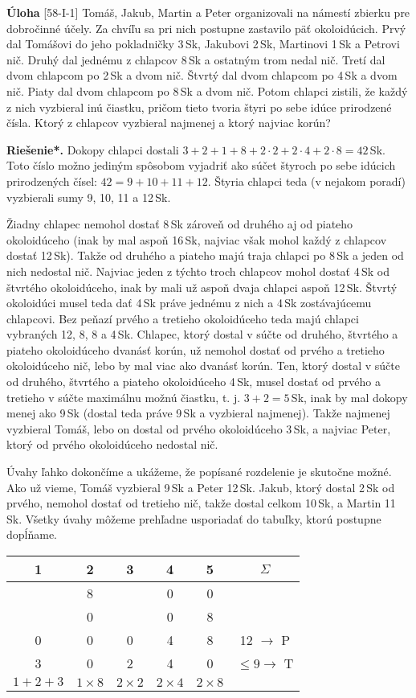 \documentclass{article}
\newcommand{\rieh}{\textbf{Riešenie*.} }
\newcommand{\problem}[4]{
  \begin{tcolorbox}[breakable,notitle,boxrule=0pt,colback=light-gray,colframe=light-gray]
    \textbf{Úloha}
    [#1] #3
  \end{tcolorbox}
  \noindent#4
}
\begin{document}
\problem{58-I-1}{}{
Tomáš, Jakub, Martin a Peter organizovali na námestí zbierku pre dobročinné účely. Za chvíľu sa pri nich postupne zastavilo päť okoloidúcich. Prvý dal Tomášovi do jeho pokladničky 3\,Sk, Jakubovi 2\,Sk, Martinovi 1\,Sk a Petrovi nič. Druhý dal jednému
z chlapcov 8\,Sk a ostatným trom nedal nič. Tretí dal dvom chlapcom po 2\,Sk a dvom nič. Štvrtý dal dvom chlapcom po 4\,Sk a dvom nič. Piaty dal dvom chlapcom po 8\,Sk a dvom nič. Potom chlapci zistili, že každý z nich vyzbieral inú čiastku, pričom tieto
tvoria štyri po sebe idúce prirodzené čísla. Ktorý z chlapcov vyzbieral najmenej a ktorý
najviac korún?
}{
\rieh Dokopy chlapci dostali $3 + 2 + 1 + 8 + 2 \cdot 2 + 2 \cdot 4 + 2 \cdot 8 = 42$\,Sk. Toto
číslo možno jediným spôsobom vyjadriť ako súčet štyroch po sebe idúcich prirodzených
čísel: $42 = 9 + 10 + 11 + 12$. Štyria chlapci teda (v nejakom poradí) vyzbierali sumy 9,
10, 11 a 12\,Sk.

Žiadny chlapec nemohol dostať 8\,Sk zároveň od druhého aj od piateho okoloidúceho
(inak by mal aspoň 16\,Sk, najviac však mohol každý z chlapcov dostať 12\,Sk). Takže od
druhého a piateho majú traja chlapci po 8\,Sk a jeden od nich nedostal nič. Najviac jeden
z týchto troch chlapcov mohol dostať 4\,Sk od štvrtého okoloidúceho, inak by mali už
aspoň dvaja chlapci aspoň 12\,Sk. Štvrtý okoloidúci musel teda dať 4\,Sk práve jednému
z nich a 4\,Sk zostávajúcemu chlapcovi. Bez peňazí prvého a tretieho okoloidúceho
teda majú chlapci vybraných 12, 8, 8 a 4\,Sk. Chlapec, ktorý dostal v súčte od druhého,
štvrtého a piateho okoloidúceho dvanásť korún, už nemohol dostať od prvého a tretieho
okoloidúceho nič, lebo by mal viac ako dvanásť korún. Ten, ktorý dostal v súčte od
druhého, štvrtého a piateho okoloidúceho 4\,Sk, musel dostať od prvého a tretieho v súčte
maximálnu možnú čiastku, t. j. $3+2 = 5$\,Sk, inak by mal dokopy menej ako 9\,Sk (dostal
teda práve 9\,Sk a vyzbieral najmenej). Takže najmenej vyzbieral Tomáš, lebo on dostal
od prvého okoloidúceho 3\,Sk, a najviac Peter, ktorý od prvého okoloidúceho nedostal
nič.

Úvahy ľahko dokončíme a ukážeme, že popísané rozdelenie je skutočne možné. Ako
už vieme, Tomáš vyzbieral 9\,Sk a Peter 12\,Sk. Jakub, ktorý dostal 2\,Sk od prvého,
nemohol dostať od tretieho nič, takže dostal celkom 10\,Sk, a Martin 11\,Sk. Všetky
úvahy môžeme prehľadne usporiadať do tabuľky, ktorú postupne dopĺňame.
    \begin{tabular}{|c|c|c|c|c|c}
        1 & 2 & 3 & 4 & 5 & $\Sigma$  \\
        \hline
         & 8 & & 0 & 0 & \\
         \hline
         & 0 & & 0 & 8 & \\
         \hline
         0 & 0 & 0 & 4 & 8 & 12 $\rightarrow$ P \\
         \hline
         3 & 0 & 2 & 4 & 0 & $\leq 9 \rightarrow $ T \\
         \hline
         $1+2+3$ & $1 \times 8$ & $2\times 2$  & $2 \times 4$ & $2 \times 8$  & \\

           \end{tabular}
}
\end{document}
